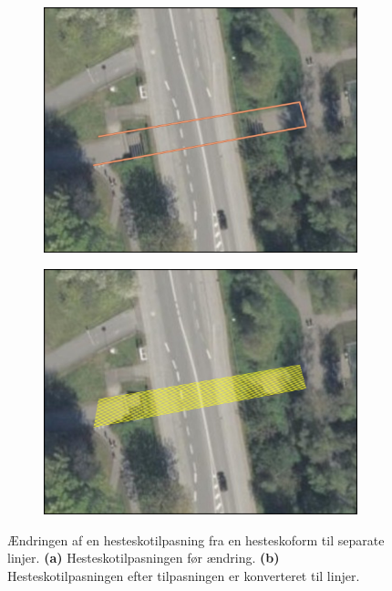 \begin{figure}[H]
    \begin{subfigure}[t]{0.5\textwidth}
        \centering
        \includegraphics[width=1\linewidth]{images/databeskrivelse/hestesko.jpg}
        \caption{}
        \label{Subfig: Hesteskotilpasninger før ændring}
    \end{subfigure}
    \hspace{0.2cm}
    \begin{subfigure}[t]{0.5\textwidth}
        \centering
        \includegraphics[width=1\linewidth]{images/metode/hestesko_linjer.jpg}
        \caption{}
        \label{Subfig: Hesteskotilpasning efter tilpasningen er konverteret til linjer}
    \end{subfigure}
    \caption{Ændringen af en hesteskotilpasning fra en hesteskoform til separate linjer. \textbf{(a)} Hesteskotilpasningen før ændring. \textbf{(b)} Hesteskotilpasningen efter tilpasningen er konverteret til linjer.}
    \label{Figur: Ændringen af hesteskotilpasningerne}
\end{figure}

